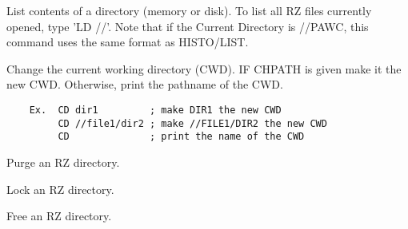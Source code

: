 \BEGARG
{}
\ENDARG
{}
\ENDOPT

   \par
List contents of a directory (memory or disk).  To list all RZ files 
   currently opened, type 'LD //'.  Note that if the Current Directory is 
   //PAWC, this command uses the same format as HISTO/LIST.  

\ENDCMD


\BEGARG
{}
\ENDARG

   \par
Change the current working directory (CWD).  IF CHPATH is given make it the 
   new CWD.  Otherwise, print the pathname of the CWD.  
\begin{verbatim}
    Ex.  CD dir1         ; make DIR1 the new CWD
         CD //file1/dir2 ; make //FILE1/DIR2 the new CWD
         CD              ; print the name of the CWD
\end{verbatim}

\ENDCMD


\BEGARG
{}
\ENDARG

   \par
Purge an RZ directory.  

\ENDCMD


\BEGARG
{}
\ENDARG

   \par
Lock an RZ directory.  

\ENDCMD


\BEGARG
{}
\ENDARG

   \par
Free an RZ directory.  

\ENDCMD

